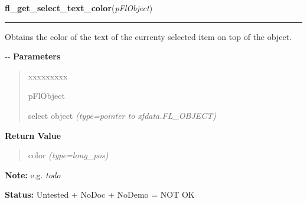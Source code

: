 \hspace{.8\funcindent}\begin{boxedminipage}{\funcwidth}

    \raggedright \textbf{fl\_get\_select\_text\_color}(\textit{pFlObject})

    \vspace{-1.5ex}

    \rule{\textwidth}{0.5\fboxrule}
\setlength{\parskip}{2ex}

Obtains the color of the text of the currenty selected item on top of
the object.

-{}-
\setlength{\parskip}{1ex}
      \textbf{Parameters}
      \vspace{-1ex}

      \begin{quote}
        \begin{Ventry}{xxxxxxxxx}

          \item[pFlObject]


select object
            {\it (type=pointer to xfdata.FL\_OBJECT)}

        \end{Ventry}

      \end{quote}

      \textbf{Return Value}
    \vspace{-1ex}

      \begin{quote}

color
      {\it (type=long\_pos)}

      \end{quote}

\textbf{Note:} 
e.g. \emph{todo}


\textbf{Status:} 
Untested + NoDoc + NoDemo = NOT OK


    \end{boxedminipage}

    \label{xformslib:flselect:fl_set_select_text_color}

    \vspace{0.5ex}

